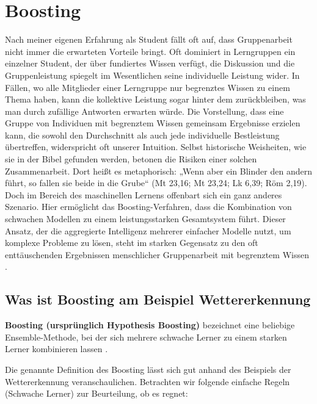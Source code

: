 \section{Boosting}
Nach meiner eigenen Erfahrung als Student fällt oft auf, dass Gruppenarbeit nicht immer die erwarteten Vorteile bringt. Oft dominiert in Lerngruppen ein einzelner Student, der über fundiertes Wissen verfügt, die Diskussion und die Gruppenleistung spiegelt im Wesentlichen seine individuelle Leistung wider. 
\newline
In Fällen, wo alle Mitglieder einer Lerngruppe nur begrenztes Wissen zu einem Thema haben, kann die kollektive Leistung sogar hinter dem zurückbleiben, was man durch zufällige Antworten erwarten würde. Die Vorstellung, dass eine Gruppe von Individuen mit begrenztem Wissen gemeinsam Ergebnisse erzielen kann, die sowohl den Durchschnitt als auch jede individuelle Bestleistung übertreffen, widerspricht oft unserer Intuition. Selbst historische Weisheiten, wie sie in der Bibel gefunden werden, betonen die Risiken einer solchen Zusammenarbeit. Dort heißt es metaphorisch: „Wenn aber ein Blinder den andern führt, so fallen sie beide in die Grube“ (Mt 23,16; Mt 23,24; Lk 6,39; Röm 2,19).
\newline
\newline
Doch im Bereich des maschinellen Lernens offenbart sich ein ganz anderes Szenario. Hier ermöglicht das Boosting-Verfahren, dass die Kombination von schwachen Modellen zu einem leistungsstarken Gesamtsystem führt. Dieser Ansatz, der die aggregierte Intelligenz mehrerer einfacher Modelle nutzt, um komplexe Probleme zu lösen, steht im starken Gegensatz zu den oft enttäuschenden Ergebnissen menschlicher Gruppenarbeit mit begrenztem Wissen \cite[S.~3]{SchapireFreund2012}.

\subsection{Was ist Boosting am Beispiel Wettererkennung}
\begin{mdframed}
    \textbf{Boosting (ursprünglich Hypothesis Boosting)} bezeichnet eine beliebige Ensemble-Methode, bei der sich mehrere schwache Lerner zu einem starken Lerner kombinieren lassen \textcite[S.~191]{Geron2018}.
\end{mdframed}

Die genannte Definition des Boosting lässt sich gut anhand des Beispiels der Wettererkennung veranschaulichen. Betrachten wir folgende einfache Regeln (Schwache Lerner) zur Beurteilung, ob es regnet:

